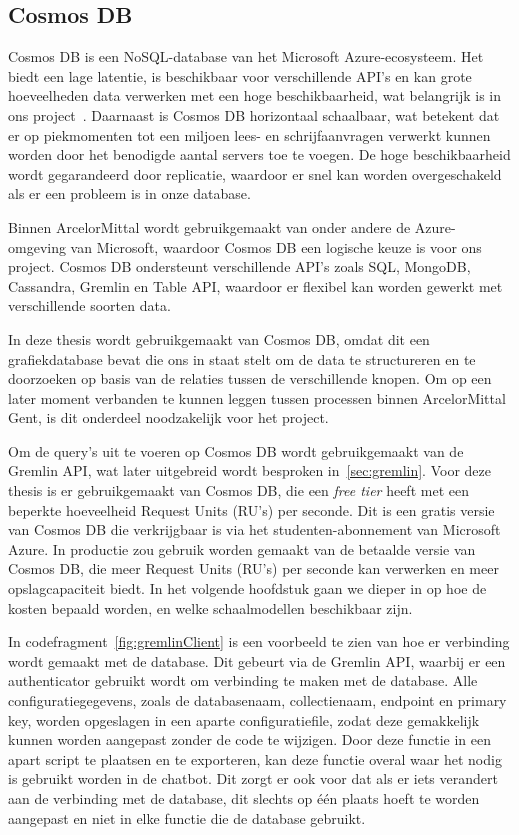 \subsection{Cosmos DB}
Cosmos DB is een NoSQL-database van het Microsoft Azure-ecosysteem. Het biedt een lage latentie, is beschikbaar voor verschillende API's en kan grote hoeveelheden data verwerken met een hoge beschikbaarheid, wat belangrijk is in ons project~\autocite{CosmosDB2024}.
Daarnaast is Cosmos DB horizontaal schaalbaar, wat betekent dat er op piekmomenten tot een miljoen lees- en schrijfaanvragen verwerkt kunnen worden door het benodigde aantal servers toe te voegen.
De hoge beschikbaarheid wordt gegarandeerd door replicatie, waardoor er snel kan worden overgeschakeld als er een probleem is in onze database.

Binnen ArcelorMittal wordt gebruikgemaakt van onder andere de Azure-omgeving van Microsoft, waardoor Cosmos DB een logische keuze is voor ons project.
Cosmos DB ondersteunt verschillende API's zoals SQL, MongoDB, Cassandra, Gremlin en Table API, waardoor er flexibel kan worden gewerkt met verschillende soorten data.

In deze thesis wordt gebruikgemaakt van Cosmos DB, omdat dit een grafiekdatabase bevat die ons in staat stelt om de data te structureren en te doorzoeken op basis van de relaties tussen de verschillende knopen.
Om op een later moment verbanden te kunnen leggen tussen processen binnen ArcelorMittal Gent, is dit onderdeel noodzakelijk voor het project.

Om de query's uit te voeren op Cosmos DB wordt gebruikgemaakt van de Gremlin API, wat later uitgebreid wordt besproken in~\ref{sec:gremlin}.
Voor deze thesis is er gebruikgemaakt van Cosmos DB, die een \emph{free tier} heeft met een beperkte hoeveelheid Request Units (RU's) per seconde.
Dit is een gratis versie van Cosmos DB die verkrijgbaar is via het studenten-abonnement van Microsoft Azure.
In productie zou gebruik worden gemaakt van de betaalde versie van Cosmos DB, die meer Request Units (RU's) per seconde kan verwerken en meer opslagcapaciteit biedt.
In het volgende hoofdstuk gaan we dieper in op hoe de kosten bepaald worden, en welke schaalmodellen beschikbaar zijn.

In codefragment~\ref{fig:gremlinClient} is een voorbeeld te zien van hoe er verbinding wordt gemaakt met de database. Dit gebeurt via de Gremlin API, waarbij er een authenticator gebruikt wordt om verbinding te maken met de database.
Alle configuratiegegevens, zoals de databasenaam, collectienaam, endpoint en primary key, worden opgeslagen in een aparte configuratiefile, zodat deze gemakkelijk kunnen worden aangepast zonder de code te wijzigen.
Door deze functie in een apart script te plaatsen en te exporteren, kan deze functie overal waar het nodig is gebruikt worden in de chatbot.
Dit zorgt er ook voor dat als er iets verandert aan de verbinding met de database, dit slechts op één plaats hoeft te worden aangepast en niet in elke functie die de database gebruikt.

